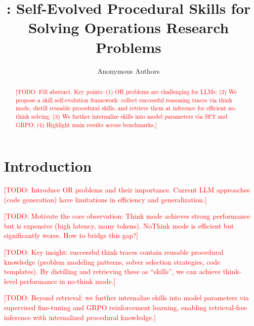 \documentclass[11pt]{article}
\title{\ours{}: Self-Evolved Procedural Skills for\\Solving Operations Research Problems}
\author{
  Anonymous Authors
}
\date{}
\newcommand{\todo}[1]{\textcolor{red}{[TODO: #1]}}
\begin{document}
\maketitle

\begin{abstract}

\todo{Fill abstract. Key points: (1) OR problems are challenging for LLMs; (2) We propose a skill self-evolution framework: collect successful reasoning traces via think mode, distill reusable procedural skills, and retrieve them at inference for efficient no-think solving; (3) We further internalize skills into model parameters via SFT and GRPO; (4) Highlight main results across benchmarks.}

\end{abstract}

\section{Introduction}
\label{sec:intro}

\todo{Introduce OR problems and their importance. Current LLM approaches (code generation) have limitations in efficiency and generalization.}

\todo{Motivate the core observation: Think mode achieves strong performance but is expensive (high latency, many tokens). NoThink mode is efficient but significantly worse. How to bridge this gap?}

\todo{Key insight: successful think traces contain reusable procedural knowledge (problem modeling patterns, solver selection strategies, code templates). By distilling and retrieving these as ``skills'', we can achieve think-level performance in no-think mode.}

\todo{Beyond retrieval: we further internalize skills into model parameters via supervised fine-tuning and GRPO reinforcement learning, enabling retrieval-free inference with internalized procedural knowledge.}
\end{document}
